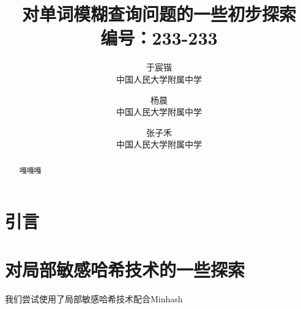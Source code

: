 \documentclass[UTF8]{ctexart}
\begin{document}
	\title{对单词模糊查询问题的一些初步探索\\ \Large 编号：233-233}
	\author{于宸锴\\ 中国人民大学附属中学\and 杨晨\\ 中国人民大学附属中学\and 张子禾\\ 中国人民大学附属中学}
	\maketitle
	\begin{abstract}
		嘎嘎嘎
	\end{abstract}
	\section{引言}
	\section{对局部敏感哈希技术的一些探索}
	我们尝试使用了局部敏感哈希技术配合Minhash
	\begin{thebibliography}{50}
		
	\end{thebibliography}
\end{document}
